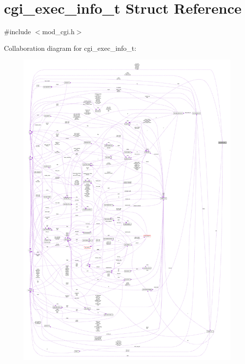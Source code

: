 \hypertarget{structcgi__exec__info__t}{}\section{cgi\+\_\+exec\+\_\+info\+\_\+t Struct Reference}
\label{structcgi__exec__info__t}


{\ttfamily \#include $<$mod\+\_\+cgi.\+h$>$}



Collaboration diagram for cgi\+\_\+exec\+\_\+info\+\_\+t\+:
\nopagebreak
\begin{figure}[H]
\begin{center}
\leavevmode
\includegraphics[width=350pt]{structcgi__exec__info__t__coll__graph}
\end{center}
\end{figure}
